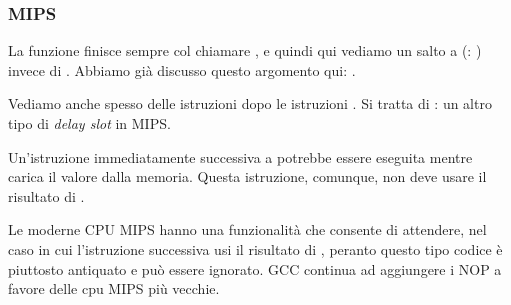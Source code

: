 \subsubsection{MIPS}




La funzione finisce sempre col chiamare \puts, e quindi qui vediamo un salto a \puts (: ) invece di .
Abbiamo già discusso questo argomento qui: .

Vediamo anche spesso delle istruzioni  dopo le istruzioni .
Si tratta di : un altro tipo di \emph{delay slot} in MIPS.

Un'istruzione immediatamente successiva a  potrebbe essere eseguita mentre  carica il valore dalla memoria.
Questa istruzione, comunque, non deve usare il risultato di .

Le moderne CPU MIPS hanno una funzionalità che consente di attendere, nel caso in cui l'istruzione successiva usi il risultato di 
, peranto questo tipo codice è piuttosto antiquato e può essere ignorato. GCC continua ad aggiungere i NOP a favore delle cpu MIPS più vecchie.


